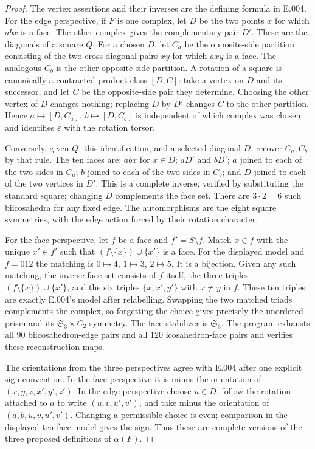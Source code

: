 \begin{proof}
The vertex assertions and their inverses are the defining formula in
E.004. For the edge perspective, if $F$ is one complex, let $D$ be the
two points $x$ for which $abx$ is a face. The other complex gives the
complementary pair $D'$. These are the diagonals of a square $Q$.
For a chosen $D$, let $C_a$ be the opposite-side partition consisting
of the two cross-diagonal pairs $xy$ for which $axy$ is a face. The
analogous $C_b$ is the other opposite-side partition. A rotation of a
square is canonically a contracted-product class $[D,C]$: take a vertex
on $D$ and its successor, and let $C$ be the opposite-side pair they
determine. Choosing the other vertex of $D$ changes nothing; replacing
$D$ by $D'$ changes $C$ to the other partition. Hence
$a\mapsto[D,C_a]$, $b\mapsto[D,C_b]$ is independent of which complex
was chosen and identifies $\varepsilon$ with the rotation torsor.

Conversely, given $Q$, this identification, and a selected diagonal $D$,
recover $C_a,C_b$ by that rule. The ten faces are: $abx$ for $x\in D$;
$aD'$ and $bD'$; $a$ joined to each of the two sides in $C_a$;
$b$ joined to each of the two sides in $C_b$; and $D$ joined to each
of the two vertices in $D'$. This is a complete inverse, verified by
substituting the standard square; changing $D$ complements the face
set. There are $3\cdot2=6$ such biicosahedra for any fixed edge.
The automorphisms are the eight square symmetries, with the edge action
forced by their rotation character.

For the face perspective, let $f$ be a face and $f'=S\setminus f$.
Match $x\in f$ with the unique $x'\in f'$ such that
$(f\setminus\{x\})\cup\{x'\}$ is a face. For the displayed model and
$f=012$ the matching is $0\mapsto4$, $1\mapsto3$, $2\mapsto5$.
It is a bijection. Given any such matching, the inverse face set consists
of $f$ itself, the three triples $(f\setminus\{x\})\cup\{x'\}$, and
the six triples $\{x,x',y'\}$ with $x\ne y$ in $f$. These ten triples
are exactly E.004's model after relabelling. Swapping the two matched
triads complements the complex, so forgetting the choice gives precisely
the unordered prism and its $\mathfrak S_3\times C_2$ symmetry.
The face stabilizer is $\mathfrak S_3$. The program exhausts all $90$
biicosahedron-edge pairs and all $120$ icosahedron-face pairs and verifies
these reconstruction maps.

The orientations from the three perspectives agree with E.004 after
one explicit sign convention. In the face perspective it is minus the
orientation of $(x,y,z,x',y',z')$. In the edge perspective choose
$u\in D$, follow the rotation attached to $a$ to write
$(u,v,u',v')$, and take minus the orientation of
$(a,b,u,v,u',v')$. Changing a permissible choice is even; comparison
in the displayed ten-face model gives the sign. Thus these are complete
versions of the three proposed definitions of $\alpha(F)$.
\end{proof}

